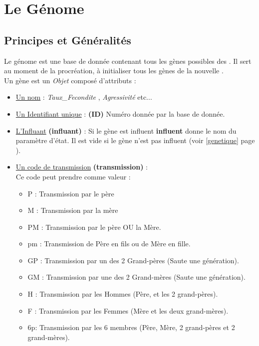 \documentclass[french]{report}
\newlength{\du}\fi
\begin{document}
\newpage	
\chapter{Le Génome}\label{genome}
\section{Principes et Généralités}
Le génome est une base de donnée contenant tous les gènes possibles des \CoCiX.
Il sert au moment de la procréation, à initialiser tous les gènes de la nouvelle \CoCiX.\\

Un gène est un \textit{Objet} composé d'attributs :

\begin{itemize}
	\item \underline{Un nom}  : \textit{Taux\_Fecondite} , \textit{Agressivité} etc...\\
	\item \underline{Un Identifiant unique} : \textbf{(ID)}  Numéro donnée par la base de donnée.\\
	\item \underline{L'Influant} \textbf{(influant)} : Si le gène est influent  \textbf{influent} donne le nom du paramètre d'état. Il est vide si le gène n'est pas influent (voir  \ref{genetique} page \pageref{genetique}).\\
	\item \underline{Un code de transmission} \textbf{(transmission)} :\\
	Ce code peut prendre comme valeur :
	\begin{itemize}
		\item P : Transmission par le père
		\item M : Transmission par la mère
		\item PM : Transmission par le père OU la Mère.
		\item pm : Transmission de Père en fils ou de Mère en fille.
		\item GP : Transmission par un des 2 Grand-pères (Saute une génération).
		\item GM : Transmission par une des 2  Grand-mères (Saute une génération).
		\item H : Transmission par les Hommes (Père, et les 2 grand-pères).
		\item F : Transmission par les Femmes (Mère et les deux grand-mères).
		\item 6p: Transmission par les 6 membres (Père, Mère, 2 grand-pères et 2 grand-mères).
	\end{itemize}
	

\end{itemize}
\end{document}

